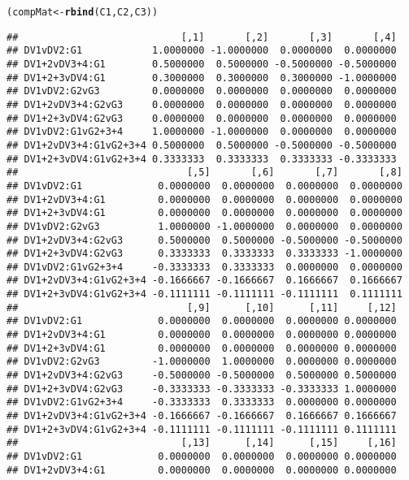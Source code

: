 \documentclass{article}\usepackage[]{graphicx}\usepackage[]{color}
\makeatletter
\newcommand{\hlstd}[1]{\textcolor[rgb]{0.345,0.345,0.345}{#1}}%
\newcommand{\hlkwb}[1]{\textcolor[rgb]{0.69,0.353,0.396}{#1}}%
\newcommand{\hlkwd}[1]{\textcolor[rgb]{0.737,0.353,0.396}{\textbf{#1}}}%
\newenvironment{kframe}{%
 \def\at@end@of@kframe{}%
 \ifinner\ifhmode%
  \def\at@end@of@kframe{\end{minipage}}%
  \begin{minipage}{\columnwidth}%
 \fi\fi%
 \def\FrameCommand##1{\hskip\@totalleftmargin \hskip-\fboxsep
 \colorbox{shadecolor}{##1}\hskip-\fboxsep
     \hskip-\linewidth \hskip-\@totalleftmargin \hskip\columnwidth}%
 \MakeFramed {\advance\hsize-\width
   \@totalleftmargin\z@ \linewidth\hsize
   \@setminipage}}%
 {\par\unskip\endMakeFramed%
 \at@end@of@kframe}
\newenvironment{knitrout}{}{} %
\makeatother
\begin{document}
\begin{knitrout}
\color{fgcolor}\begin{kframe}
\begin{alltt}
\hlstd{(compMat} \hlkwb{<-} \hlkwd{rbind}\hlstd{(C1,C2,C3))}
\end{alltt}
\begin{verbatim}
##                            [,1]       [,2]       [,3]       [,4]
## DV1vDV2:G1            1.0000000 -1.0000000  0.0000000  0.0000000
## DV1+2vDV3+4:G1        0.5000000  0.5000000 -0.5000000 -0.5000000
## DV1+2+3vDV4:G1        0.3000000  0.3000000  0.3000000 -1.0000000
## DV1vDV2:G2vG3         0.0000000  0.0000000  0.0000000  0.0000000
## DV1+2vDV3+4:G2vG3     0.0000000  0.0000000  0.0000000  0.0000000
## DV1+2+3vDV4:G2vG3     0.0000000  0.0000000  0.0000000  0.0000000
## DV1vDV2:G1vG2+3+4     1.0000000 -1.0000000  0.0000000  0.0000000
## DV1+2vDV3+4:G1vG2+3+4 0.5000000  0.5000000 -0.5000000 -0.5000000
## DV1+2+3vDV4:G1vG2+3+4 0.3333333  0.3333333  0.3333333 -0.3333333
##                             [,5]       [,6]       [,7]       [,8]
## DV1vDV2:G1             0.0000000  0.0000000  0.0000000  0.0000000
## DV1+2vDV3+4:G1         0.0000000  0.0000000  0.0000000  0.0000000
## DV1+2+3vDV4:G1         0.0000000  0.0000000  0.0000000  0.0000000
## DV1vDV2:G2vG3          1.0000000 -1.0000000  0.0000000  0.0000000
## DV1+2vDV3+4:G2vG3      0.5000000  0.5000000 -0.5000000 -0.5000000
## DV1+2+3vDV4:G2vG3      0.3333333  0.3333333  0.3333333 -1.0000000
## DV1vDV2:G1vG2+3+4     -0.3333333  0.3333333  0.0000000  0.0000000
## DV1+2vDV3+4:G1vG2+3+4 -0.1666667 -0.1666667  0.1666667  0.1666667
## DV1+2+3vDV4:G1vG2+3+4 -0.1111111 -0.1111111 -0.1111111  0.1111111
##                             [,9]      [,10]      [,11]     [,12]
## DV1vDV2:G1             0.0000000  0.0000000  0.0000000 0.0000000
## DV1+2vDV3+4:G1         0.0000000  0.0000000  0.0000000 0.0000000
## DV1+2+3vDV4:G1         0.0000000  0.0000000  0.0000000 0.0000000
## DV1vDV2:G2vG3         -1.0000000  1.0000000  0.0000000 0.0000000
## DV1+2vDV3+4:G2vG3     -0.5000000 -0.5000000  0.5000000 0.5000000
## DV1+2+3vDV4:G2vG3     -0.3333333 -0.3333333 -0.3333333 1.0000000
## DV1vDV2:G1vG2+3+4     -0.3333333  0.3333333  0.0000000 0.0000000
## DV1+2vDV3+4:G1vG2+3+4 -0.1666667 -0.1666667  0.1666667 0.1666667
## DV1+2+3vDV4:G1vG2+3+4 -0.1111111 -0.1111111 -0.1111111 0.1111111
##                            [,13]      [,14]      [,15]     [,16]
## DV1vDV2:G1             0.0000000  0.0000000  0.0000000 0.0000000
## DV1+2vDV3+4:G1         0.0000000  0.0000000  0.0000000 0.0000000

\end{verbatim}
\end{kframe}
\end{knitrout}
\end{document}
